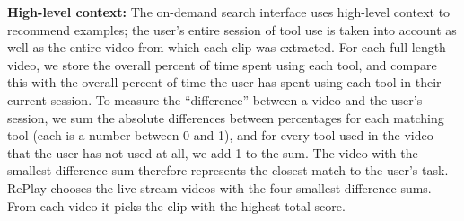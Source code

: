 \textbf{High-level context:} The on-demand search interface uses high-level context to recommend examples; the user's entire session of tool use is taken into account as well as the entire video from which each clip was extracted. %
For each full-length video, we store the overall percent of time spent using each tool, and compare this with the overall percent of time the user has spent using each tool in their current session. To measure the ``difference'' between a video and the user's session, we sum the absolute differences between percentages for each matching tool (each is a number between 0 and 1), and for every tool used in the video that the user has not used at all, we add 1 to the sum. The video with the smallest difference sum therefore represents the closest match to the user's task. RePlay chooses the live-stream videos with the four smallest difference sums. From each video it picks the  clip with the highest total score.%



